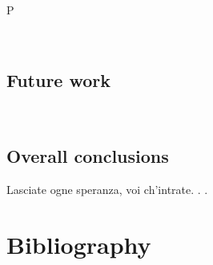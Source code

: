 \documentclass[a4paper, twoside]{templates/ociamthesis}
\begin{document}
P

~

\hypertarget{future-work}{%
\section{Future work}\label{future-work}}

~

\hypertarget{overall-conclusions}{%
\section{Overall conclusions}\label{overall-conclusions}}

\begin{savequote}
Lasciate ogne speranza, voi ch'intrate. . .
\end{savequote}

\hypertarget{bibliography}{%
\chapter{Bibliography}\label{bibliography}}
\end{document}

